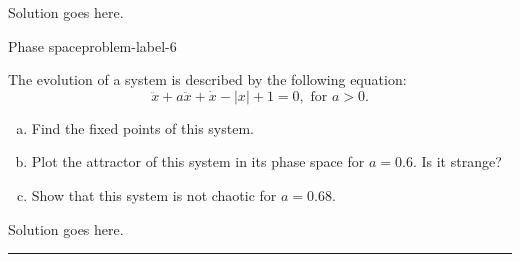 Solution goes here.

\begin{problem}{Phase space}{problem-label-6}

    The evolution of a system is described by the following equation:
    \[
        \ddot{x} + a\ddot{x}+\dot{x}-|x|+1=0, \text{ for } a > 0.
    \]

    \begin{enumerate}[(a)]
        \item Find the fixed points of this system.
        \item Plot the attractor of this system in its phase space for $a = 0.6$.
        Is it strange?
        \item Show that this system is not chaotic for $a = 0.68$.
    \end{enumerate}

\end{problem}

Solution goes here.






\vspace{5ex}
\hrule
\vspace{1ex}

\vspace{0.1ex}




% 
% 

